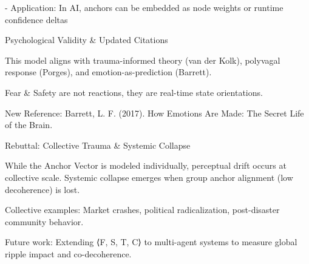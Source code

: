 \documentclass[11pt]{article}
\begin{document}
- Application: In AI, anchors can be embedded as node weights or runtime confidence deltas

Psychological Validity & Updated Citations

This model aligns with trauma-informed theory (van der Kolk), polyvagal response (Porges), and emotion-as-prediction (Barrett).

Fear & Safety are not reactions, they are real-time state orientations.

New Reference: Barrett, L. F. (2017). How Emotions Are Made: The Secret Life of the Brain.

Rebuttal: Collective Trauma & Systemic Collapse

While the Anchor Vector is modeled individually, perceptual drift occurs at collective scale. Systemic collapse emerges when group anchor alignment (low decoherence) is lost.

Collective examples: Market crashes, political radicalization, post-disaster community behavior.

Future work: Extending ⟨F, S, T, C⟩ to multi-agent systems to measure global ripple impact and co-decoherence.
\end{document}
